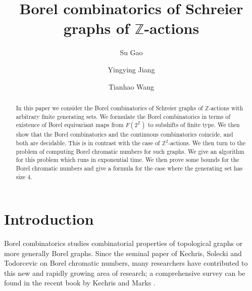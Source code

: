 \documentclass[11pt]{amsart}
\theoremstyle{definition}
\def\Z{\mathbb{Z}}
\def\Z{\mathbb{Z}}
\begin{document}
\title{Borel combinatorics of Schreier graphs of $\Z$-actions}



\author{Su Gao}
\address{School of Mathematical Sciences and LPMC, Nankai University, Tianjin 300071, P.R. China}

\author{Yingying Jiang}
\address{School of Mathematical Sciences and LPMC, Nankai University, Tianjin 300071, P.R. China}

\author{Tianhao Wang}
\address{School of Mathematical Sciences and LPMC, Nankai University, Tianjin 300071, P.R. China}


\begin{abstract} In this paper we consider the Borel combinatorics of Schreier graphs of $\Z$-actions with arbitrary finite generating sets. We formulate the Borel combinatorics in terms of existence of Borel equivariant maps from $F(2^\Z)$ to subshifts of finite type. We then show that the Borel combinatorics and the continuous combinatorics coincide, and both are decidable. This is in contrast with the case of $\Z^2$-actions. We then turn to the problem of computing Borel chromatic numbers for such graphs. We give an algorithm for this problem which runs in exponential time. We then prove some bounds for the Borel chromatic numbers and give a formula for the case where the generating set has size $4$.
\end{abstract}



\maketitle

\section{Introduction}
Borel combinatorics studies combinatorial properties of topological graphs or more generally Borel graphs. Since the seminal paper of Kechris, Solecki and Todorcevic \cite{KST} on Borel chromatic numbers, many researchers have contributed to this new and rapidly growing area of research; a comprehensive survey can be found in the recent book by Kechris and Marks \cite{KM}.
\end{document}
